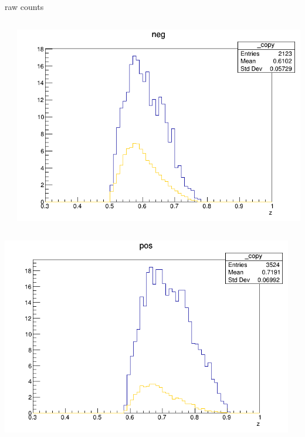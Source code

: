 \begin{frame}{raw counts}
\begin{columns}
\begin{column}[T]{0.25\textwidth}
\end{column}
\begin{column}[T]{0.25\textwidth}
\includegraphics[width = \textwidth]{results/yield/statistics/yield_x_Q2_z_0.40_4.000_0.60_neg.png}
\end{column}
\end{columns}
\begin{columns}
\begin{column}[T]{0.25\textwidth}
\includegraphics[width = \textwidth]{results/yield/statistics/yield_x_Q2_z_0.40_4.000_0.70_pos.png}
\end{column}
\begin{column}[T]{0.25\textwidth}

\end{column}
\end{columns}
\end{frame}

